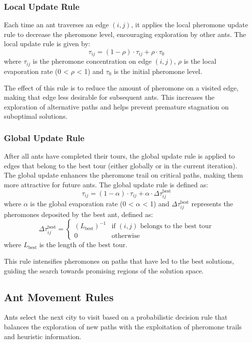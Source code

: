 \subsubsection{Local Update Rule}
Each time an ant traverses an edge $(i,j)$, it applies the local pheromone update rule to decrease the pheromone level, encouraging exploration by other ants. The local update rule is given by:
\[
	\tau_{ij} = (1 - \rho) \cdot \tau_{ij} + \rho \cdot \tau_0
\]
where $\tau_{ij}$ is the pheromone concentration on edge $(i,j)$, $\rho$ is the local evaporation rate (0 < $\rho$ < 1) and $\tau_0$ is the initial pheromone level.

The effect of this rule is to reduce the amount of pheromone on a visited edge, making that edge less desirable for subsequent ants. This increases the exploration of alternative paths and helps prevent premature stagnation on suboptimal solutions.

\subsubsection{Global Update Rule}
After all ants have completed their tours, the global update rule is applied to edges that belong to the best tour (either globally or in the current iteration). The global update enhances the pheromone trail on critical paths, making them more attractive for future ants. The global update rule is defined as:
\[
	\tau_{ij} = (1 - \alpha) \cdot \tau_{ij} + \alpha \cdot \Delta \tau_{ij}^{\text{best}}
\]
where $\alpha$ is the global evaporation rate (0 < $\alpha$ < 1) and $\Delta \tau_{ij}^{\text{best}}$ represents the pheromones deposited by the best ant, defined as:
\[
	\Delta \tau_{ij}^{\text{best}} = \begin{cases}
		(L_{\text{best}})^{-1} & \text{if }(i,j)\text{ belongs to the best tour} \\
		0                      & \text{otherwise}
	\end{cases}
\]
where $L_{\text{best}}$ is the length of the best tour.

This rule intensifies pheromones on paths that have led to the best solutions, guiding the search towards promising regions of the solution space.

\subsection{Ant Movement Rules}

Ants select the next city to visit based on a probabilistic decision rule that balances the exploration of new paths with the exploitation of pheromone trails and heuristic information.


